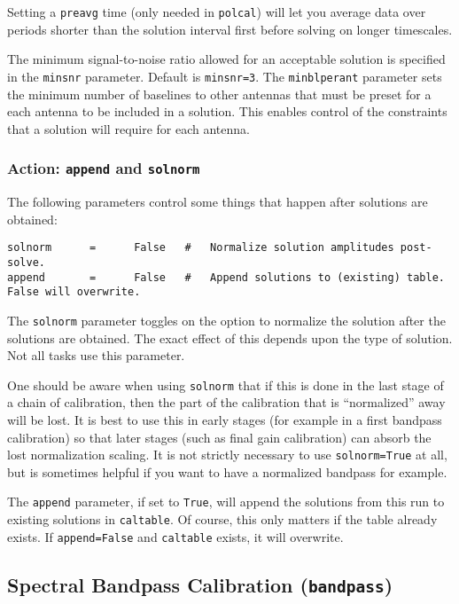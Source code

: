 Setting a {\tt preavg} time (only needed in {\tt polcal}) will let you
average data over periods shorter than the solution interval first
before solving on longer timescales.

The minimum signal-to-noise ratio allowed for an acceptable solution
is specified in the {\tt minsnr} parameter.  Default is {\tt minsnr=3}.
The {\tt minblperant} parameter sets the minimum number of baselines
to other antennas that must be preset for a each antenna to be
included in a solution.  This enables control of the constraints
that a solution will require for each antenna.

\subsubsection{Action: {\tt append} and {\tt solnorm} }
\label{section:cal.solve.pars.action}

The following parameters control some things that happen after
solutions are obtained:
\small
\begin{verbatim}
solnorm      =      False   #   Normalize solution amplitudes post-solve.
append       =      False   #   Append solutions to (existing) table.  False will overwrite.
\end{verbatim} 
\normalsize

The {\tt solnorm} parameter toggles on the option to normalize the
solution after the solutions are obtained.  The exact
effect of this depends upon the type of solution.  Not all tasks
use this parameter.  

One should be aware when using {\tt solnorm} that if this is done
in the last stage of a chain of calibration, then the part of 
the calibration that is ``normalized'' away will be lost.  It is
best to use this in early stages (for example in a first bandpass
calibration) so that later stages (such as final gain calibration)
can absorb the lost normalization scaling.  It is not strictly
necessary to use {\tt solnorm=True} at all, but is sometimes helpful
if you want to have a normalized bandpass for example.

The {\tt append} parameter, if set to {\tt True}, will append the
solutions from this run to existing solutions in {\tt caltable}.
Of course, this only matters if the table already exists.  If
{\tt append=False} and {\tt caltable} exists, it will overwrite.

\subsection{Spectral Bandpass Calibration ({\tt bandpass})}
\label{section:cal.solve.band}

